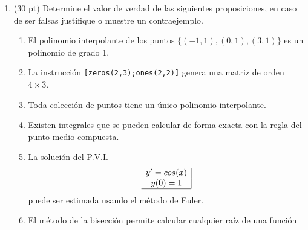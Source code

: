 \documentclass[11pt]{article}
\newcommand{\vof}[3]{
\item
\fbox{ \begin{minipage}{1cm}   \hfill\vspace{1cm}  #1    \end{minipage} } 
    \begin{minipage}{0.4\textwidth}
    #2
    \end{minipage} 
    \begin{minipage}{0.4\textwidth}
    #3
    \end{minipage}}
\begin{document}
\begin{enumerate}
\item (30 pt) Determine el valor de verdad de las siguientes proposiciones, en caso de ser falsas justifique o muestre un contraejemplo.
\begin{enumerate}
\vof{}{El polinomio interpolante de los puntos $\{(-1,1),(0,1),(3,1)\}$ es un polinomio de grado 1.}{}
\vof{}{La instrucci\'on \texttt{[zeros(2,3);ones(2,2)]} genera una matriz de orden $4\times 3$.}{}
\vof{}{Toda colecci\'on de puntos tiene un \'unico polinomio interpolante.}{}
\vof{}{Existen integrales que se pueden calcular de forma exacta con la regla del punto medio compuesta.}{}
\vof{}{La soluci\'on del P.V.I. 
$$\begin{array}{c|}y'=cos(x)\\ y(0)=1 \\ \hline\end{array}$$
puede ser estimada usando el m\'etodo de Euler.}{}
\vof{}{El m\'etodo de la bisecci\'on permite calcular cualquier ra\'iz de una funci\'on}{}
\end{enumerate}


\end{enumerate}
\end{document}
